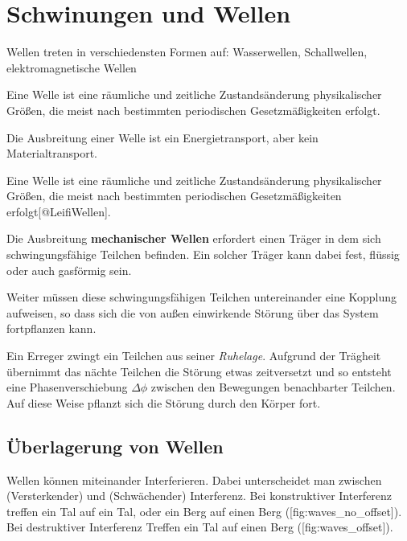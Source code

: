 \chapter{Schwinungen und Wellen}

\startitemize[packed]
\item Wellen treten in verschiedensten Formen auf: Wasserwellen, Schallwellen, elektromagnetische Wellen
\item Eine Welle ist eine räumliche und zeitliche Zustandsänderung physikalischer Größen, die meist nach bestimmten periodischen Gesetzmäßigkeiten erfolgt.
\item Die Ausbreitung einer Welle ist ein Energietransport, aber kein Materialtransport.
\stopitemize

\startdefinition[title={Welle}]
Eine Welle ist eine räumliche und zeitliche Zustandsänderung physikalischer Größen, die meist nach bestimmten periodischen Gesetzmäßigkeiten erfolgt[@LeifiWellen].
\stopdefinition

Die Ausbreitung {\bf mechanischer Wellen} erfordert einen Träger in dem sich
schwingungsfähige Teilchen befinden. Ein solcher Träger kann dabei fest,
flüssig oder auch gasförmig sein.

Weiter müssen diese schwingungsfähigen Teilchen untereinander eine Kopplung
aufweisen, so dass sich die von außen einwirkende Störung über das System
fortpflanzen kann.

Ein Erreger zwingt ein Teilchen aus seiner {\em Ruhelage}. Aufgrund der Trägheit
übernimmt das nächte Teilchen die Störung etwas zeitversetzt und so entsteht
eine Phasenverschiebung $\Delta \phi$ zwischen den Bewegungen benachbarter
Teilchen. Auf diese Weise pflanzt sich die Störung durch den Körper fort.

\section{Überlagerung von Wellen}

Wellen können miteinander Interferieren. Dabei unterscheidet man zwischen
 (Versterkender) und
 (Schwächender) Interferenz. Bei
konstruktiver Interferenz treffen ein Tal auf ein Tal, oder ein Berg auf einen
Berg ([fig:waves_no_offset]). Bei destruktiver Interferenz Treffen
ein Tal auf einen Berg ([fig:waves_offset]).

